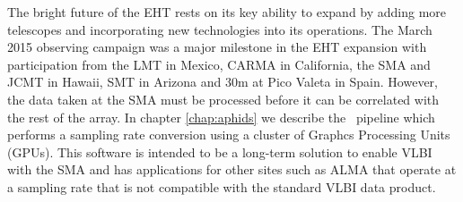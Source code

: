 The bright future of the EHT rests on its key ability to expand by adding more telescopes and
incorporating new technologies into its operations.  The March 2015 observing campaign was a major milestone in
the EHT expansion with participation from the LMT in Mexico, CARMA in California, the SMA and JCMT in Hawaii, 
SMT in Arizona and 30m at Pico Valeta in Spain.  However, the data taken at the SMA must be processed before it
can be correlated with the rest of the array.  In chapter \ref{chap:aphids} we describe the \APHIDS\, pipeline
which performs a sampling rate conversion using a cluster of Graphcs Processing Units (GPUs).  This software
is intended to be a long-term solution to enable VLBI with the SMA and has applications for other sites such 
as ALMA that operate at a sampling rate that is not compatible with the standard VLBI data product.

